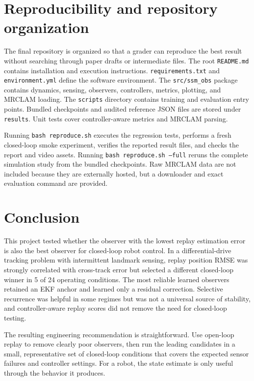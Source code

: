 \documentclass[11pt]{article}
\begin{document}
\section{Reproducibility and repository organization}
The final repository is organized so that a grader can reproduce the best result without searching through paper drafts or intermediate files. The root \texttt{README.md} contains installation and execution instructions. \texttt{requirements.txt} and \texttt{environment.yml} define the software environment. The \texttt{src/ssm\_obs} package contains dynamics, sensing, observers, controllers, metrics, plotting, and MRCLAM loading. The \texttt{scripts} directory contains training and evaluation entry points. Bundled checkpoints and audited reference JSON files are stored under \texttt{results}. Unit tests cover controller-aware metrics and MRCLAM parsing.

Running \texttt{bash reproduce.sh} executes the regression tests, performs a fresh closed-loop smoke experiment, verifies the reported result files, and checks the report and video assets. Running \texttt{bash reproduce.sh --full} reruns the complete simulation study from the bundled checkpoints. Raw MRCLAM data are not included because they are externally hosted, but a downloader and exact evaluation command are provided.

\section{Conclusion}
This project tested whether the observer with the lowest replay estimation error is also the best observer for closed-loop robot control. In a differential-drive tracking problem with intermittent landmark sensing, replay position RMSE was strongly correlated with cross-track error but selected a different closed-loop winner in 5 of 24 operating conditions. The most reliable learned observers retained an EKF anchor and learned only a residual correction. Selective recurrence was helpful in some regimes but was not a universal source of stability, and controller-aware replay scores did not remove the need for closed-loop testing.

The resulting engineering recommendation is straightforward. Use open-loop replay to remove clearly poor observers, then run the leading candidates in a small, representative set of closed-loop conditions that covers the expected sensor failures and controller settings. For a robot, the state estimate is only useful through the behavior it produces.
\end{document}
